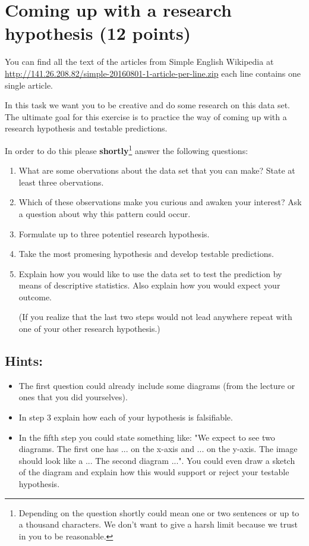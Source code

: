 \documentclass{WeSTassignment}
\begin{document}
\section{Coming up with a research hypothesis (12 points)}
You can find all the text of the articles from Simple English Wikipedia at \url{http://141.26.208.82/simple-20160801-1-article-per-line.zip} each line contains one single article. 

In this task we want you to be creative and do some research on this data set. The ultimate goal for this exercise is to practice the way of coming up with a research hypothesis and testable predictions. 

In order to do this please \textbf{shortly}\footnote{Depending on the question shortly could mean one or two sentences or up to a thousand characters. We don't want to give a harsh limit because we trust in you to be reasonable.} answer the following questions: 

\begin{enumerate}
\item What are some obervations about the data set that you can make? State at least three obervations.
\item Which of these observations make you curious and awaken your interest? Ask a question about why this pattern could occur.
\item Formulate up to three potentiel research hypothesis.
\item Take the most promesing hypothesis and develop testable predictions.
\item Explain how you would like to use the data set to test the prediction by means of descriptive statistics. Also explain how you would expect your outcome. 

(If you realize that the last two steps would not lead anywhere repeat with one of your other research hypothesis.)
\end{enumerate}

\subsection{Hints:}
\begin{itemize}
\item The first question could already include some diagrams (from the lecture or ones that you did yourselves).
\item In step 3 explain how each of your hypothesis is falsifiable. 
\item In the fifth step you could state something like: "We expect to see two diagrams. The first one has ... on the x-axis and ... on the y-axis. The image should look like a ... The second diagram ...". You could even draw a sketch of the diagram and explain how this would support or reject your testable hypothesis. 
\end{itemize}
\end{document}
